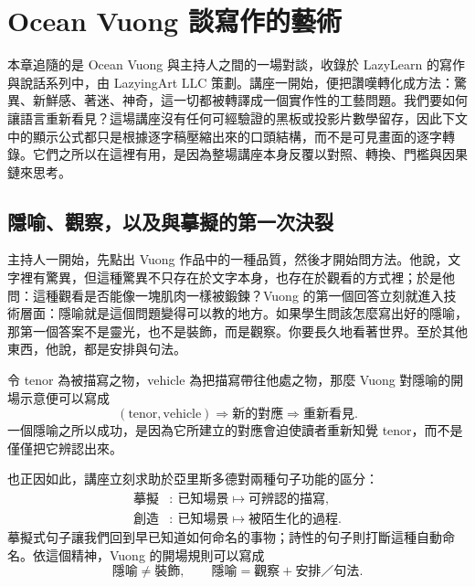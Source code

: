 \chapter{Ocean Vuong 談寫作的藝術}

本章追隨的是 Ocean Vuong 與主持人之間的一場對談，收錄於 LazyLearn 的寫作與說話系列中，由 LazyingArt LLC 策劃。講座一開始，便把讚嘆轉化成方法：驚異、新鮮感、著迷、神奇，這一切都被轉譯成一個實作性的工藝問題。我們要如何讓語言重新看見？這場講座沒有任何可經驗證的黑板或投影片數學留存，因此下文中的顯示公式都只是根據逐字稿壓縮出來的口頭結構，而不是可見畫面的逐字轉錄。它們之所以在這裡有用，是因為整場講座本身反覆以對照、轉換、門檻與因果鏈來思考。

\section{隱喻、觀察，以及與摹擬的第一次決裂}

主持人一開始，先點出 Vuong 作品中的一種品質，然後才開始問方法。他說，文字裡有驚異，但這種驚異不只存在於文字本身，也存在於觀看的方式裡；於是他問：這種觀看是否能像一塊肌肉一樣被鍛鍊？Vuong 的第一個回答立刻就進入技術層面：隱喻就是這個問題變得可以教的地方。如果學生問該怎麼寫出好的隱喻，那第一個答案不是靈光，也不是裝飾，而是觀察。你要長久地看著世界。至於其他東西，他說，都是安排與句法。

\begin{definition}
令 tenor 為被描寫之物，vehicle 為把描寫帶往他處之物，那麼 Vuong 對隱喻的開場示意便可以寫成
\begin{equation}
(\text{tenor},\text{vehicle}) \Longrightarrow \text{新的對應} \Longrightarrow \text{重新看見}.
\end{equation}
一個隱喻之所以成功，是因為它所建立的對應會迫使讀者重新知覺 tenor，而不是僅僅把它辨認出來。
\end{definition}

也正因如此，講座立刻求助於亞里斯多德對兩種句子功能的區分：
\begin{align}
\text{摹擬} &:\ \text{已知場景} \mapsto \text{可辨認的描寫},\\
\text{創造} &:\ \text{已知場景} \mapsto \text{被陌生化的過程}.
\end{align}
摹擬式句子讓我們回到早已知道如何命名的事物；詩性的句子則打斷這種自動命名。依這個精神，Vuong 的開場規則可以寫成
\begin{equation}
\text{隱喻} \neq \text{裝飾}, \qquad \text{隱喻} = \text{觀察} + \text{安排／句法}.
\end{equation}

